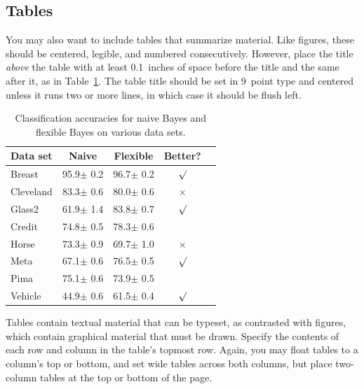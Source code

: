 \documentclass{article}
\begin{document}
\subsection{Tables} 
 
You may also want to include tables that summarize material. Like 
figures, these should be centered, legible, and numbered consecutively. 
However, place the title {\it above\/} the table with at least 
0.1~inches of space before the title and the same after it, as in 
Table~\ref{sample-table}. The table title should be set in 9~point 
type and centered unless it runs two or more lines, in which case it
should be flush left.


\begin{table}[t]
\caption{Classification accuracies for naive Bayes and flexible 
Bayes on various data sets.}
\label{sample-table}
\vskip 0.15in
\begin{center}
\begin{small}
\begin{sc}
\begin{tabular}{lcccr}
\hline
\abovespace\belowspace
Data set & Naive & Flexible & Better? \\
\hline
\abovespace
Breast    & 95.9$\pm$ 0.2& 96.7$\pm$ 0.2& $\surd$ \\
Cleveland & 83.3$\pm$ 0.6& 80.0$\pm$ 0.6& $\times$\\
Glass2    & 61.9$\pm$ 1.4& 83.8$\pm$ 0.7& $\surd$ \\
Credit    & 74.8$\pm$ 0.5& 78.3$\pm$ 0.6&         \\
Horse     & 73.3$\pm$ 0.9& 69.7$\pm$ 1.0& $\times$\\
Meta      & 67.1$\pm$ 0.6& 76.5$\pm$ 0.5& $\surd$ \\
Pima      & 75.1$\pm$ 0.6& 73.9$\pm$ 0.5&         \\
\belowspace
Vehicle   & 44.9$\pm$ 0.6& 61.5$\pm$ 0.4& $\surd$ \\
\hline
\end{tabular}
\end{sc}
\end{small}
\end{center}
\vskip -0.1in
\end{table}

Tables contain textual material that can be typeset, as contrasted 
with figures, which contain graphical material that must be drawn. 
Specify the contents of each row and column in the table's topmost
row. Again, you may float tables to a column's top or bottom, and set
wide tables across both columns, but place two-column tables at the
top or bottom of the page.
 
\end{document}
